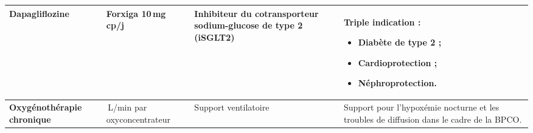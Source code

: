 \begin{xltabular}{\linewidth}{>{\raggedright\arraybackslash\bfseries}p{3.1cm} >{\raggedright\arraybackslash}p{2.6cm} >{\raggedright\arraybackslash}p{4.0cm} >{\raggedright\arraybackslash}X}
    Dapagliflozine & 
    Forxiga 10\,mg  cp/j & 
    Inhibiteur du cotransporteur sodium-glucose de type 2 (iSGLT2) & 
    Triple indication :
    \begin{itemize}[leftmargin=*, nosep]
        \item Diabète de type 2 ;
        \item Cardioprotection ;
        \item Néphroprotection.
    \end{itemize} \\
    \midrule

    Oxygénothérapie chronique & 
    2\,L/min par oxyconcentrateur & 
    Support ventilatoire & 
    Support pour l'hypoxémie nocturne et les troubles de diffusion dans le cadre de la BPCO. \\
\end{xltabular}
